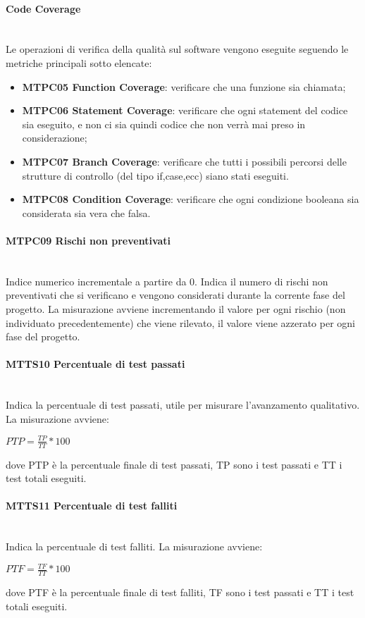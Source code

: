 \paragraph{Code Coverage}\-\\
Le operazioni di verifica della qualità sul software vengono eseguite seguendo le metriche principali sotto elencate:
\begin{itemize}
	\item \textbf{MTPC05 Function Coverage}: verificare che una funzione sia chiamata;
	\item \textbf{MTPC06 Statement Coverage}: verificare che ogni statement del codice sia eseguito, e non ci sia quindi codice che non verrà mai preso in considerazione;
	\item \textbf{MTPC07 Branch Coverage}: verificare che tutti i possibili percorsi delle strutture di controllo (del tipo if,case,ecc) siano stati eseguiti.
	\item \textbf{MTPC08 Condition Coverage}: verificare che ogni condizione booleana sia considerata sia vera che falsa.
\end{itemize}

\paragraph{MTPC09 Rischi non preventivati}\-\\
Indice numerico incrementale a partire da 0. Indica il numero di rischi non preventivati che si verificano e vengono considerati durante la corrente fase del progetto. La misurazione avviene incrementando il valore per ogni rischio (non individuato precedentemente) che viene rilevato, il valore viene azzerato per ogni fase del progetto.

\paragraph{MTTS10 Percentuale di test passati}\-\\
Indica la percentuale di test passati, utile per misurare l'avanzamento qualitativo. La misurazione avviene:
\begin{center}
	\item $PTP = \frac{TP}{TT}*100$
\end{center}
dove PTP è la percentuale finale di test passati, TP sono i test passati e TT i test totali eseguiti.

\paragraph{MTTS11 Percentuale di test falliti}\-\\
Indica la percentuale di test falliti. La misurazione avviene:
\begin{center}
	\item $PTF = \frac{TF}{TT}*100$
\end{center}
dove PTF è la percentuale finale di test falliti, TF sono i test passati e TT i test totali eseguiti.

